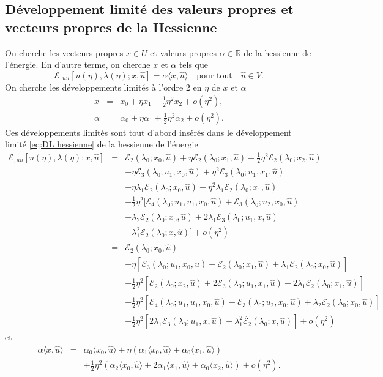 \documentclass{article}
\begin{document}
\subsection{Développement limité des valeurs propres et vecteurs
propres de la Hessienne}

On cherche les vecteurs propres $x∈U$ et valeurs propres $α \in
\mathbb{R}$ de la hessienne de l'énergie. En d'autre terme, on cherche $x$
et $α$ tels que
\begin{equation}
  ℰ_{, u  u} [u (η), λ (η) ; x, \hat{u}] =
  α \langle x, \hat{u} \rangle \quad \text{pour tout} \quad \hat{u} \in
  V.
\end{equation}
On cherche les développements limités à l'ordre 2 en $η$ de $x$
et $α$
\begin{eqnarray*}
  x & = & x_0 + η x_1 + \tfrac{1}{2} η^2 x_2 + o (η^2),\\
  α & = & α_0 + η α_1 + \tfrac{1}{2} η^2 α_2 + o
  (η^2) .
\end{eqnarray*}
Ces développements limités sont tout d'abord insérés dans le
développement limité \eqref{eq:DL hessienne} de la hessienne de
l'énergie
\begin{eqnarray*}
  ℰ_{, u  u} [u (η), λ (η) ; x, \hat{u}] & = &
  ℰ_2 (λ_0 ; x_0, \hat{u}) + η ℰ_2 (λ_0 ;
  x_1, \hat{u}) + \tfrac{1}{2} η^2 ℰ_2 (λ_0 ; x_2,
  \hat{u})\\
  &  & + η ℰ_3 (λ_0 ; u_1, x_0, \hat{u}) + η^2
  ℰ_3 (λ_0 ; u_1, x_1, \hat{u})\\
  &  & + η λ_1  \dot{ℰ_2} (λ_0 ; x_0, \hat{u}) +
  η^2 λ_1  \dot{ℰ_2} (λ_0 ; x_1, \hat{u})\\
  &  & + \tfrac{1}{2} η^2  [ℰ_4 (λ_0 ; u_1, u_1, x_0,
  \hat{u})  +ℰ_3 (λ_0 ; u_2, x_0, \hat{u})\\
  &  & + λ_2  \dot{ℰ_2} (λ_0 ; x_0, \hat{u}) + 2
  λ_1  \dot{ℰ_3} (λ_0 ; u_1, x, \hat{u})\\
  &  & + λ_1^2  \ddot{ℰ_2} (λ_0 ; x, \hat{u})
  ] + o (η^2)\\
  & = & ℰ_2 (λ_0 ; x_0, \hat{u})\\
  &  & + η [ℰ_3 (λ_0 ; u_1, x_0, \hat{u}) +ℰ_2
  (λ_0 ; x_1, \hat{u}) + λ_1  \dot{ℰ_2} (λ_0 ;
  x_0, \hat{u})]\\
  &  & + \tfrac{1}{2} η^2  [ℰ_2 (λ_0 ; x_2, \hat{u}) +
  2ℰ_3 (λ_0 ; u_1, x_1, \hat{u}) + 2 λ_1
  \dot{ℰ_2} (λ_0 ; x_1, \hat{u})]\\
  &  & + \tfrac{1}{2} η^2  [ℰ_4 (λ_0 ; u_1, u_1, x_0,
  \hat{u}) +ℰ_3 (λ_0 ; u_2, x_0, \hat{u}) + λ_2
  \dot{ℰ_2} (λ_0 ; x_0, \hat{u})]\\
  &  & + \tfrac{1}{2} η^2  [2 λ_1  \dot{ℰ_3} (λ_0 ;
  u_1, x, \hat{u}) + λ_1^2  \ddot{ℰ_2} (λ_0 ; x,
  \hat{u})] + o (η^2)
\end{eqnarray*}
et
\begin{eqnarray*}
  α \langle x, \hat{u} \rangle & = & α_0  \langle x_0, \hat{u}
  \rangle + η (α_1 \langle x_0, \hat{u} \rangle + α_0 \langle
  x_1, \hat{u} \rangle)\\
  &  & + \tfrac{1}{2} η^2  (α_2 \langle x_0, \hat{u} \rangle + 2
  α_1 \langle x_1, \hat{u} \rangle + α_0 \langle x_2, \hat{u}
  \rangle) + o (η^2) .
\end{eqnarray*}
\end{document}
